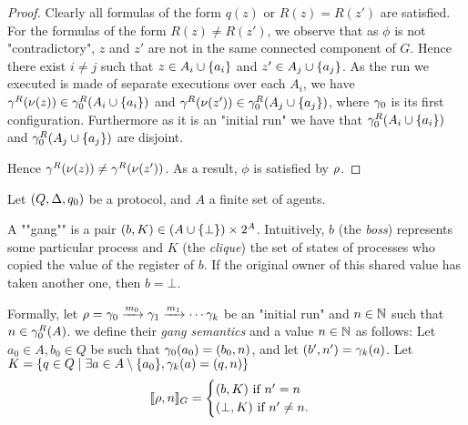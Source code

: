 \begin{proof}
	Clearly all formulas of the form $q(z)$ or $R(z) = R(z')$ are satisfied.
	For the formulas of the form $R(z) \neq R(z')$, we observe that as $\phi$ is not "contradictory", $z$ and $z'$ are not in the same connected component of $G$. 
	Hence there exist $i \neq j$ such that $z \in A_i\cup \{a_i\}$ and $z' \in A_j\cup \{a_j\}$. As the run we executed is made of separate executions over each $A_i$, we have $\gamma^R(\nu(z)) \in \gamma_0^R(A_i\cup\{a_i\})$ and $\gamma^R(\nu(z')) \in \gamma_0^R(A_j\cup\{a_j\})$, where $\gamma_0$ is its first configuration. Furthermore as it is an "initial run" we have that $\gamma_0^R(A_i\cup\{a_i\})$ and $\gamma_0^R(A_j\cup\{a_j\})$ are disjoint.
	
	Hence $\gamma^R(\nu(z)) \neq \gamma^R(\nu(z'))$. As a result, $\phi$ is satisfied by $\rho$.
\end{proof}

\begin{definition}
	Let $(Q,\Delta, q_0)$ be a protocol, and $A$ a finite set of agents.
	
	A ""gang"" is a pair $(b, K) \in (A \cup \{\bot\}) \times 2^{A}$.
	Intuitively, $b$ (the \emph{boss}) represents some particular process and $K$ (the \emph{clique}) the set of states of processes who copied the value of the register of $b$. If the original owner of this shared value has taken another one, then $b = \bot$.
	
	Formally, let $\rho = \gamma_0 \xrightarrow{m_0} \gamma_1 \xrightarrow{m_1} \cdots \gamma_k$ be an "initial run" and $n \in \mathbb{N}$ such that $n \in \gamma_0^R(A)$.
	we define their \emph{gang semantics} and a value $n \in \mathbb{N}$ as follows:
	Let $a_0 \in A, b_0 \in Q$ be such that $\gamma_0(a_0) = (b_0,n)$, and let $(b', n') = \gamma_k(a)$.
	Let $K = \{q \in Q \mid \exists a \in A\setminus \{a_0\}, \gamma_k(a) = (q,n)\}$
	\[
	[\![\rho,n]\!]_G= 
	\begin{cases}
		(b,K) \text{ if } n'=n\\
		(\bot, K) \text{ if } n'\neq n.
	\end{cases} 
	\]
\end{definition} 

